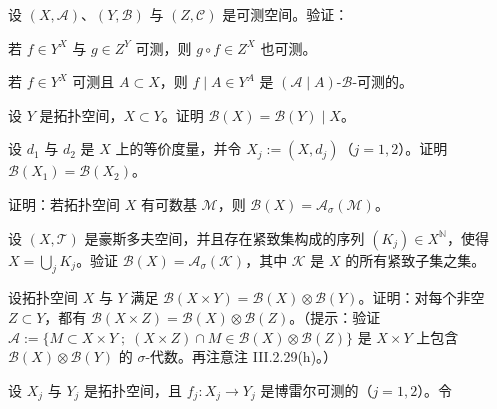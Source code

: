 \begin{exercises}
\item

设 $ (X,\mathcal{A}) $、$ (Y,\mathcal{B}) $ 与 $ (Z,\mathcal{C}) $ 是可测空间。验证：

\begin{items}
\item

若 $ f\in Y^X $ 与 $ g\in Z^Y $ 可测，则 $ g\circ f\in Z^X $ 也可测。

\item

若 $ f\in Y^X $ 可测且 $ A\subset X $，则 $ f\mid A\in Y^A $ 是 $ (\mathcal{A}\mid A) $-$ \mathcal{B} $-可测的。

\end{items}

\item

设 $ Y $ 是拓扑空间，$ X\subset Y $。证明 $ \mathcal{B}(X)=\mathcal{B}(Y)\mid X $。

\item

设 $ d_1 $ 与 $ d_2 $ 是 $ X $ 上的等价度量，并令 $ X_j := (X,d_j) $（$ j=1,2 $）。证明 $ \mathcal{B}(X_1)=\mathcal{B}(X_2) $。

\item

证明：若拓扑空间 $ X $ 有可数基 $ \mathcal{M} $，则 $ \mathcal{B}(X)=\mathcal{A}_\sigma(\mathcal{M}) $。

\item

设 $ (X,\mathcal{T}) $ 是豪斯多夫空间，并且存在紧致集构成的序列 $ (K_j)\in X^{\mathbb{N}} $，使得 $ X=\bigcup_j K_j $。验证 $ \mathcal{B}(X)=\mathcal{A}_\sigma(\mathcal{K}) $，其中 $ \mathcal{K} $ 是 $ X $ 的所有紧致子集之集。

\item

设拓扑空间 $ X $ 与 $ Y $ 满足 $ \mathcal{B}(X\times Y)=\mathcal{B}(X)\otimes\mathcal{B}(Y) $。证明：对每个非空 $ Z\subset Y $，都有 $ \mathcal{B}(X\times Z)=\mathcal{B}(X)\otimes\mathcal{B}(Z) $。（提示：验证 $ \mathcal{A} := \{ M\subset X\times Y \;;\; (X\times Z)\cap M\in\mathcal{B}(X)\otimes\mathcal{B}(Z) \} $ 是 $ X\times Y $ 上包含 $ \mathcal{B}(X)\otimes\mathcal{B}(Y) $ 的 $ \sigma $-代数。再注意注 III.2.29(h)。）

\item

设 $ X_j $ 与 $ Y_j $ 是拓扑空间，且 $ f_j : X_j\to Y_j $ 是博雷尔可测的（$ j=1,2 $）。令


\end{exercises}
